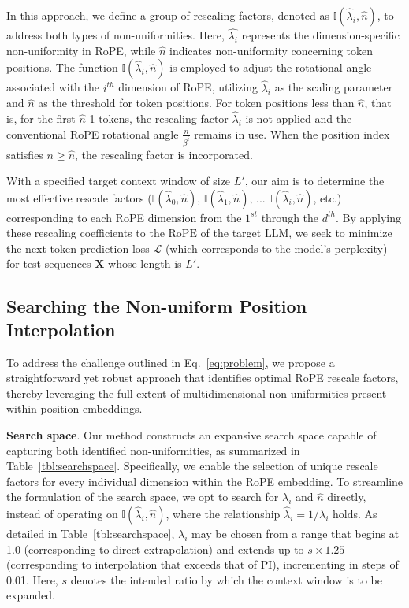In this approach, we define a group of rescaling factors, denoted as $\mathbb{I}(\hat{\lambda}_{i},\hat{n})$, to address both types of non-uniformities. Here, $\hat{\lambda_i}$ represents the dimension-specific non-uniformity in RoPE, while $\hat{n}$ indicates non-uniformity concerning token positions. The function $\mathbb{I}(\hat{\lambda}_{i},\hat{n})$ is employed to adjust the rotational angle associated with the $i^{th}$ dimension of RoPE, utilizing $\hat{\lambda}_i$ as the scaling parameter and $\hat{n}$ as the threshold for token positions. For token positions less than $\hat{n}$, that is, for the first $\hat{n}$-1 tokens, the rescaling factor $\hat{\lambda}_i$ is not applied and the conventional RoPE rotational angle $\frac{n}{\beta^i}$ remains in use. When the position index satisfies $n \geq \hat{n}$, the rescaling factor is incorporated.

With a specified target context window of size $L'$, our aim is to determine the most effective rescale factors ($\mathbb{I}(\hat{\lambda}_{0},\hat{n})$, $\mathbb{I}(\hat{\lambda}_{1},\hat{n})$, ... $\mathbb{I}(\hat{\lambda}_{i},\hat{n})$, etc.) corresponding to each RoPE dimension from the $1^{st}$ through the $d^{th}$. By applying these rescaling coefficients to the $\text{RoPE}$ of the target $\text{LLM}$, we seek to minimize the next-token prediction loss $\mathcal{L}$ (which corresponds to the model’s perplexity) for test sequences $\mathbf{X}$ whose length is $L'$.

\subsection{Searching the Non-uniform Position Interpolation}

To address the challenge outlined in Eq.~\ref{eq:problem}, we propose a straightforward yet robust approach that identifies optimal RoPE rescale factors, thereby leveraging the full extent of multidimensional non-uniformities present within position embeddings.

\textbf{Search space}. Our method constructs an expansive search space capable of capturing both identified non-uniformities, as summarized in Table~\ref{tbl:searchspace}. Specifically, we enable the selection of unique rescale factors for every individual dimension within the RoPE embedding. To streamline the formulation of the search space, we opt to search for $\lambda_i$ and $\hat{n}$ directly, instead of operating on $\mathbb{I}(\hat{\lambda}_{i},\hat{n})$, where the relationship $\hat{\lambda}_{i}=1/\lambda_i$ holds. As detailed in Table~\ref{tbl:searchspace}, $\lambda_i$ may be chosen from a range that begins at 1.0 (corresponding to direct extrapolation) and extends up to $s\times1.25$ (corresponding to interpolation that exceeds that of PI), incrementing in steps of 0.01. Here, $s$ denotes the intended ratio by which the context window is to be expanded.

